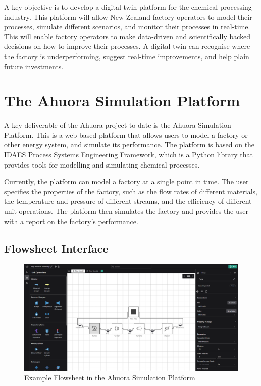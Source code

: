 \documentclass[12pt]{report}
\begin{document}
A key objective is to develop a digital twin platform for the chemical processing industry. This platform will allow New Zealand factory operators to model their processes, simulate different scenarios, and monitor their processes in real-time.
This will enable factory operators to make data-driven and scientifically backed decisions on how to improve their processes. A digital twin can recognise where the factory is underperforming, suggest real-time improvements, and help plain future investments.

\section{The Ahuora Simulation Platform}

A key deliverable of the Ahuora project to date is the Ahuora Simulation Platform. This is a web-based platform that allows users to model a factory or other energy system, and simulate its performance. The platform is based on the IDAES Process Systems Engineering Framework, which is a Python library that provides tools for modelling and simulating chemical processes.

Currently, the platform can model a factory at a single point in time. The user specifies the properties of the factory, such as the flow rates of different materials, the temperature and pressure of different streams, and the efficiency of different unit operations. The platform then simulates the factory and provides the user with a report on the factory's performance.

\subsection{Flowsheet Interface}


\begin{figure}
    \centering
    \includegraphics[width=\textwidth]{platform_screenshot.png}
    \caption{Example Flowsheet in the Ahuora Simulation Platform}
    \label{fig:platform}
\end{figure}
\end{document}
